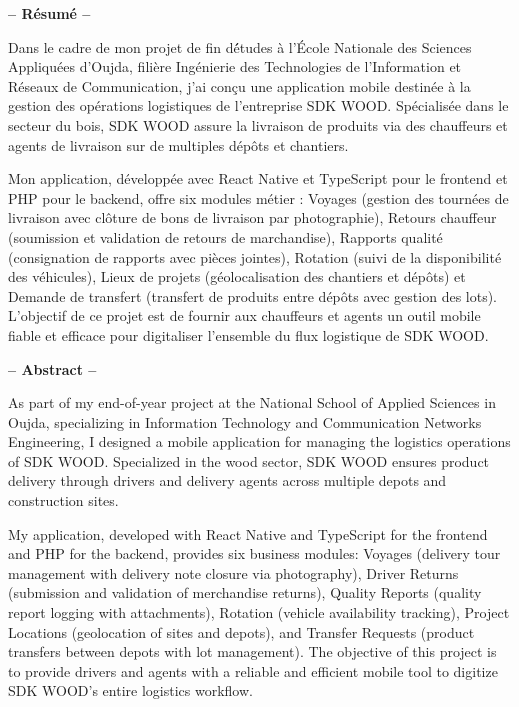 \documentclass[12pt,a4paper]{article}
\begin{document}
\newpage

\thispagestyle{empty}
\vspace*{0.5cm}
\begin{center}
{\Large \textbf{-- R\'esum\'e --}}
\end{center}
\vspace{0.3cm}

Dans le cadre de mon projet de fin d\'études \`a l'\'Ecole Nationale des Sciences Appliqu\'ees d'Oujda, fili\`ere Ing\'enierie des Technologies de l'Information et R\'eseaux de Communication, j'ai con\c cu une application mobile destin\'ee \`a la gestion des op\'erations logistiques de l'entreprise SDK WOOD. Sp\'ecialis\'ee dans le secteur du bois, SDK WOOD assure la livraison de produits via des chauffeurs et agents de livraison sur de multiples d\'ep\^ots et chantiers.

Mon application, d\'evelopp\'ee avec React Native et TypeScript pour le frontend et PHP pour le backend, offre six modules m\'etier : Voyages (gestion des tourn\'ees de livraison avec cl\^oture de bons de livraison par photographie), Retours chauffeur (soumission et validation de retours de marchandise), Rapports qualit\'e (consignation de rapports avec pi\`eces jointes), Rotation (suivi de la disponibilit\'e des v\'ehicules), Lieux de projets (g\'eolocalisation des chantiers et d\'ep\^ots) et Demande de transfert (transfert de produits entre d\'ep\^ots avec gestion des lots). L'objectif de ce projet est de fournir aux chauffeurs et agents un outil mobile fiable et efficace pour digitaliser l'ensemble du flux logistique de SDK WOOD.

\vspace{1cm}

\begin{center}
{\Large \textbf{-- Abstract --}}
\end{center}
\vspace{0.3cm}

As part of my end-of-year project at the National School of Applied Sciences in Oujda, specializing in Information Technology and Communication Networks Engineering, I designed a mobile application for managing the logistics operations of SDK WOOD. Specialized in the wood sector, SDK WOOD ensures product delivery through drivers and delivery agents across multiple depots and construction sites.

My application, developed with React Native and TypeScript for the frontend and PHP for the backend, provides six business modules: Voyages (delivery tour management with delivery note closure via photography), Driver Returns (submission and validation of merchandise returns), Quality Reports (quality report logging with attachments), Rotation (vehicle availability tracking), Project Locations (geolocation of sites and depots), and Transfer Requests (product transfers between depots with lot management). The objective of this project is to provide drivers and agents with a reliable and efficient mobile tool to digitize SDK WOOD's entire logistics workflow.
\end{document}
